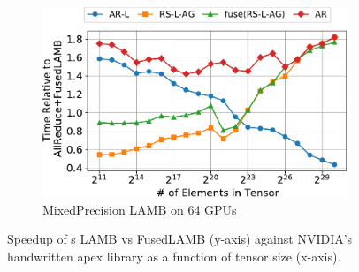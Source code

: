 \begin{figure}
\begin{subfigure}{0.66\columnwidth}
    \includegraphics[width=\columnwidth]{figures/results-lambfp16-64-gpus.pdf}  
    \caption{MixedPrecision LAMB on 64 GPUs} 
  \end{subfigure}
  \caption{Speedup of \tool s LAMB vs FusedLAMB (y-axis) against
    NVIDIA's handwritten apex library as a function of tensor size
    (x-axis). \label{fig:speedupsVSapex}}
\end{figure}
\fi
 
